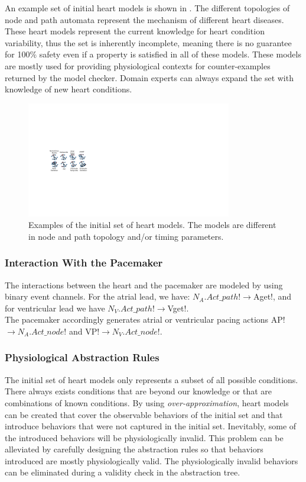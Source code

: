 An example set of initial heart models is shown in .
The different topologies of node and path automata represent the mechanism of different heart diseases.
These heart models represent the current knowledge for heart condition variability, thus the set is inherently incomplete, meaning there is no guarantee for 100\% safety even if a property is satisfied in all of these models.
These models are mostly used for providing physiological contexts for counter-examples returned by the model checker.
Domain experts can always expand the set with knowledge of new heart conditions.
\begin{figure}[!h]
	\centering
	\includegraphics[width=0.8\textwidth]{figs/init.pdf}
	\caption{\small Examples of the initial set of heart models. The models are different in node and path topology and/or timing parameters.}
	\label{fig:init}
\end{figure}
\subsubsection{Interaction With the Pacemaker}
The interactions between the heart and the pacemaker are modeled by using binary event channels. For the atrial lead, we have:
\textsf{$N_A.Act\_path!\rightarrow$Aget!},
and for ventricular lead we have
\textsf{$N_V.Act\_path!\rightarrow$Vget!}.\\
The pacemaker accordingly generates atrial or ventricular pacing actions \textsf{AP!$\rightarrow N_A.Act\_node!$} and \textsf{VP!$\rightarrow N_V.Act\_node!$}.
\subsubsection{Physiological Abstraction Rules}
The initial set of heart models only represents a subset of all possible conditions.
There always exists conditions that are beyond our knowledge or that are combinations of known conditions.
By using \emph{over-approximation}, heart models can be created that cover the observable behaviors of the initial set and that introduce behaviors that were not captured in the initial set.
Inevitably, some of the introduced behaviors will be physiologically invalid.
This problem can be alleviated by carefully designing the abstraction rules so that behaviors introduced are mostly physiologically valid.
The physiologically invalid behaviors can be eliminated during a validity check in the abstraction tree.

